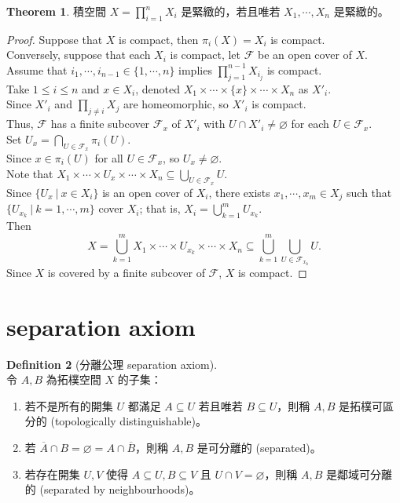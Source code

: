 \documentclass[12pt]{article}
\theoremstyle{definition}
\newtheorem{definition}{Definition}[section]
\newtheorem{theorem}[definition]{Theorem}
\newcommand\<{\langle}
\renewcommand\>{\rangle}
\begin{document}
\begin{CJK}{UTF8}{bsmi}
\begin{theorem}
    積空間 $X=\prod_{i=1}^n X_i$ 是緊緻的，若且唯若 $X_1, \cdots, X_n$ 是緊緻的。
\end{theorem}
\begin{proof}
    Suppose that $X$ is compact, then $\pi_i(X)=X_i$ is compact. \\
    Conversely, suppose that each $X_i$ is compact, let $\mathcal{F}$ be an open cover of $X$. \\
    Assume that $i_1, \cdots, i_{n-1}\in\{1, \cdots, n\}$ implies $\prod_{j=1}^{n-1}X_{i_j}$ is compact. \\
    Take $1\le i\le n$ and $x\in X_i$, denoted $X_1\times\cdots\times\{x\}\times\cdots\times X_n$ as $X'_i$. \\
    Since $X'_i$ and $\prod_{j\ne i}X_j$ are homeomorphic, so $X'_i$ is compact. \\
    Thus, $\mathcal{F}$ has a finite subcover $\mathcal{F}_x$ of $X'_i$ with $U\cap X'_i\ne\varnothing$ for each $U\in\mathcal{F}_x$. \\
    Set $U_x = \bigcap_{U\in\mathcal{F}_x} \pi_i(U)$. \\
    Since $x\in\pi_i(U)$ for all $U\in\mathcal{F}_x$, so $U_x\ne\varnothing$. \\
    Note that $X_1\times\cdots\times U_x\times\cdots\times X_n\subseteq\bigcup_{U\in\mathcal{F}_x}U$. \\
    Since $\{U_x\ |\ x\in X_i\}$ is an open cover of $X_i$, there exists $x_1, \cdots, x_m\in X_j$ such that $\{U_{x_k}\ |\ k=1, \cdots, m\}$ cover $X_i$; that is, $X_i=\bigcup_{k=1}^m U_{x_k}$. \\
    Then
    \[
        X 
        = \bigcup_{k=1}^m X_1\times\cdots\times U_{x_k}\times\cdots\times X_n
        \subseteq \bigcup_{k=1}^m\bigcup_{U\in\mathcal{F}_{x_k}} U.
    \]
    Since $X$ is covered by a finite subcover of $\mathcal{F}$, $X$ is compact.
\end{proof}

\section{separation axiom}

\begin{definition}[分離公理 separation axiom]
    \hfill \\
    令 $A, B$ 為拓樸空間 $X$ 的子集：
    \begin{enumerate}
        \item 若不是所有的開集 $U$ 都滿足 $A\subseteq U$ 若且唯若 $B\subseteq U$，則稱 $A, B$ 是拓樸可區分的 (topologically distinguishable)。
        \item 若 $\overline{A}\cap B=\varnothing=A\cap\overline{B}$，則稱 $A, B$ 是可分離的 (separated)。
        \item 若存在開集 $U, V$ 使得 $A\subseteq U, B\subseteq V$ 且 $U\cap V=\varnothing$，則稱 $A, B$ 是鄰域可分離的 (separated by neighbourhoods)。
    \end{enumerate}
\end{definition}


\end{CJK}
\end{document}
